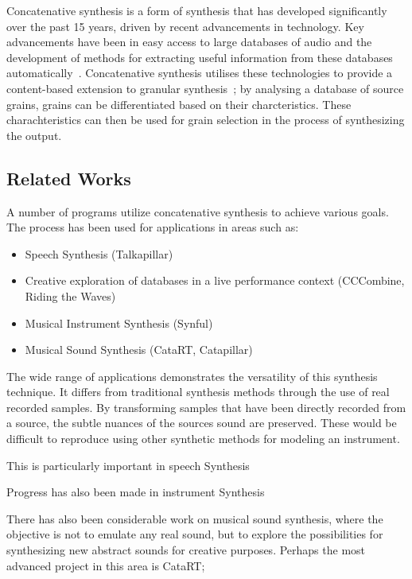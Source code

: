 \documentclass{scrartcl}
\begin{document}
    Concatenative synthesis is a form of synthesis that has developed
    significantly over the past 15 years, driven by recent advancements in
    technology. Key advancements have been in easy access to large databases of
    audio and the development of methods for extracting useful information from
    these databases automatically~\parencite[p.1]{schwarz2006cstey}.
    Concatenative synthesis utilises these technologies to provide a
    content-based extension to granular
    synthesis~\parencite[p.102]{schwarz2007cbcs}; by analysing a database of
    source grains, grains can be differentiated based on their charcteristics.
    These charachteristics can then be used for grain selection in the process
    of synthesizing the output.

    \subsection*{Related Works}
    A number of programs utilize concatenative synthesis to achieve various
    goals. The process has been used for applications in areas such as: 
    \begin{itemize}
        \item Speech Synthesis (Talkapillar)
        \item Creative exploration of databases in a live performance context
            (CCCombine, Riding the Waves)
        \item Musical Instrument Synthesis (Synful)
        \item Musical Sound Synthesis (CataRT, Catapillar)
    \end{itemize}

    The wide range of applications demonstrates the versatility of this
    synthesis technique. It differs from traditional synthesis methods through
    the use of real recorded samples. By transforming samples that have been
    directly recorded from a source, the subtle nuances of the sources sound
    are preserved. These would be difficult to reproduce using other synthetic
    methods for modeling an instrument.~\parencite[p.24]{mrks2009csrs}

    This is particularly important in speech Synthesis
    
    Progress has also been made in instrument Synthesis

    There has also been considerable work on musical sound synthesis, where the
    objective is not to emulate any real sound, but to explore the
    possibilities for synthesizing new abstract sounds for creative purposes.
    Perhaps the most advanced project in this area is CataRT;
    
\end{document}
